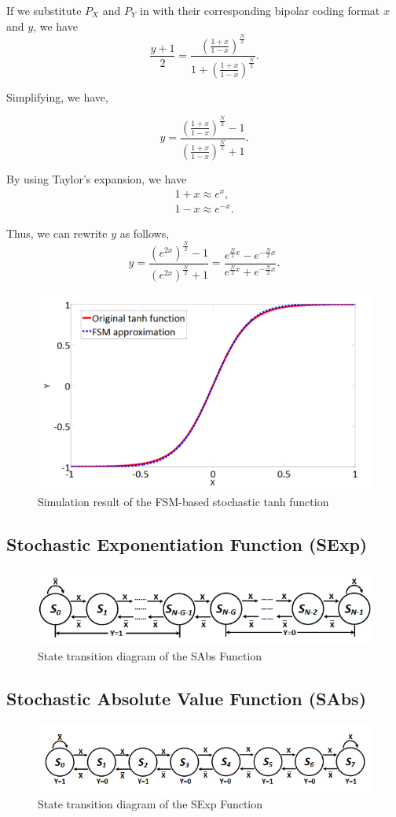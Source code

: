If we substitute $P_X$ and $P_Y$ in with their corresponding bipolar coding format $x$ and $y$, we have
$$
\frac{y+1}{2}=\frac{\left(\frac{1+x}{1-x}\right)^{\frac{N}{2}}}{1+\left(\frac{1+x}{1-x}\right)^{\frac{N}{2}}} .
$$

Simplifying, we have,

$$
y=\frac{\left(\frac{1+x}{1-x}\right)^{\frac{N}{2}}-1}{\left(\frac{1+x}{1-x}\right)^{\frac{N}{2}}+1} .
$$

By using Taylor's expansion, we have
$$
\begin{gathered}
1+x \approx e^x, \\
1-x \approx e^{-x} .
\end{gathered}
$$

Thus, we can rewrite $y$ as follows,
$$
y=\frac{\left(e^{2 x}\right)^{\frac{N}{2}}-1}{\left(e^{2 x}\right)^{\frac{N}{2}}+1}=\frac{e^{\frac{N}{2} x}-e^{-\frac{N}{2} x}}{e^{\frac{N}{2} x}+e^{-\frac{N}{2} x}} .
$$

\begin{figure}[htb]
	\includegraphics[width=12cm]{gfx/tanhgraph.png}
	\caption{Simulation result of the FSM-based stochastic
	tanh function}
	\label{fig:system:example1}
\end{figure}

\subsection{Stochastic Exponentiation Function (SExp)}
\begin{figure}[htb]
	\includegraphics[width=12cm]{gfx/explsm.png}
	\caption{State transition diagram of the SAbs Function}
	\label{fig:system:example1}
\end{figure}

\subsection{Stochastic Absolute Value Function (SAbs)}


\begin{figure}[htb]
	\includegraphics[width=12cm]{gfx/abslsm.png}
	\caption{State transition diagram of the SExp Function}
	\label{fig:system:example1}
\end{figure}